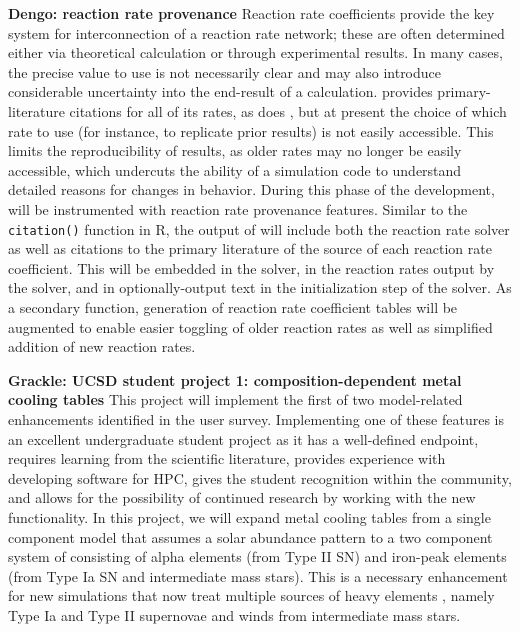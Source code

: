 \noindent \textbf{Dengo: reaction rate provenance}
Reaction rate coefficients provide the key system for interconnection of a
reaction rate network; these are often determined either via theoretical
calculation or through experimental results.  In many cases, the precise value
to use is not necessarily clear \citep[][see, e.g.,]{2011ApJ...726...55T} and
may also introduce considerable uncertainty into the end-result of a
calculation.  \grackle{} provides primary-literature citations for all of its
rates, as does \dengo{}, but at present the choice of which rate to use (for
instance, to replicate prior results) is not easily accessible.  This limits
the reproducibility of results, as older rates may no longer be easily
accessible, which undercuts the ability of a simulation code to understand
detailed reasons for changes in behavior.  During this phase of the
development, \dengo{} will be instrumented with reaction rate provenance
features.  Similar to the \texttt{citation()} function in R, the output of
\dengo{} will include both the reaction rate solver as well as citations to the
primary literature of the source of each reaction rate coefficient.  This will
be embedded in the solver, in the reaction rates output by the solver, and in
optionally-output text in the initialization step of the solver.  As a
secondary function,  generation of reaction rate coefficient tables
will be augmented to enable easier toggling of older reaction rates as well as
simplified addition of new reaction rates.

\noindent \textbf{Grackle: UCSD student project 1:
  composition-dependent metal cooling tables}
This project will implement the first of two model-related
enhancements identified in the \grackle{} user survey.
Implementing one of these features is an excellent undergraduate
student project as it has a well-defined endpoint, requires learning
from the scientific literature, provides experience with developing
software for HPC, gives the student recognition within the community,
and allows for the possibility of continued research by working with
the new functionality. In this project, we will expand 
metal cooling tables from a single
component model that assumes a solar abundance pattern to a
two component system of \citet{2013MNRAS.433.3005D} consisting of
alpha elements (from Type II SN)
and iron-peak elements (from Type Ia SN and intermediate mass stars).
This is a necessary enhancement for new simulations that now treat
multiple sources of heavy elements
\citep[e.g.,][]{2014MNRAS.444.1518V, 2015MNRAS.446..521S}, namely Type
Ia and Type II supernovae and winds from intermediate mass stars.

